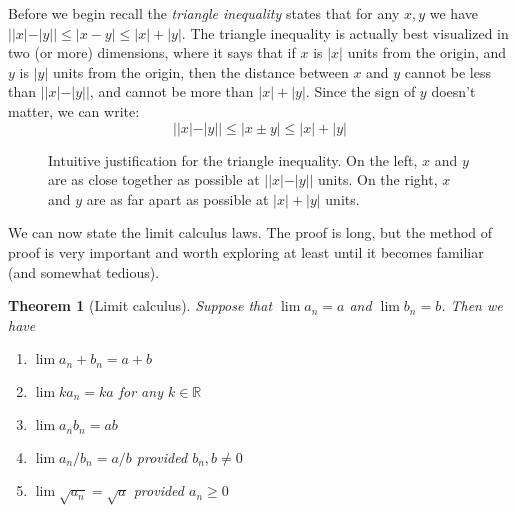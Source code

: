 \documentclass[11pt,oneside]{amsbook}
\newcommand{\R}{\mathbb R}
\theoremstyle{definition}
\theoremstyle{plain}
\newtheorem{theorem}{Theorem}[section]
\theoremstyle{definition}
\theoremstyle{remark}
\numberwithin{equation}{section}
\numberwithin{figure}{section}
\begin{document}
Before we begin recall the \emph{triangle inequality} states that for any $x,y$ we have $||x|-|y||\leq|x-y|\leq|x|+|y|$. The triangle inequality is actually best visualized in two (or more) dimensions, where it says that if $x$ is $|x|$ units from the origin, and $y$ is $|y|$ units from the origin, then the distance between $x$ and $y$ cannot be less than $||x|-|y||$, and cannot be more than $|x|+|y|$. Since the sign of $y$ doesn't matter, we can write:
\[||x|-|y||\leq|x\pm y|\leq|x|+|y|
\]

\begin{figure}[h]
  \centering
  \quad
  \caption{Intuitive justification for the triangle inequality. On the left, $x$ and $y$ are as close together as possible at $||x|-|y||$ units. On the right, $x$ and $y$ are as far apart as possible at $|x|+|y|$ units.}
\end{figure}

We can now state the limit calculus laws. The proof is long, but the method of proof is very important and worth exploring at least until it becomes familiar (and somewhat tedious).

\begin{theorem}[Limit calculus]
  Suppose that $\lim a_n=a$ and $\lim b_n=b$. Then we have
  \begin{enumerate}
    \item $\lim a_n+b_n=a+b$
    \item $\lim ka_n=ka$ for any $k\in\R$
    \item $\lim a_nb_n=ab$
    \item $\lim a_n/b_n=a/b$ provided $b_n,b\neq 0$
    \item $\lim \sqrt{a_n}=\sqrt{a}$ provided $a_n\geq0$
  \end{enumerate}
\end{theorem}
\end{document}
